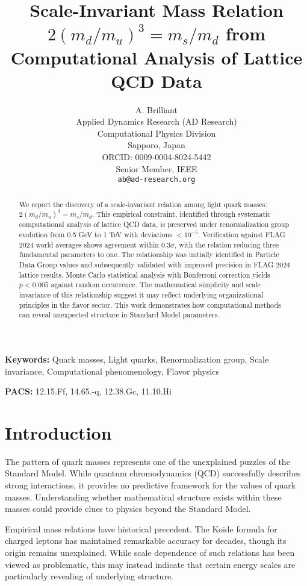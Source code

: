 \documentclass[12pt]{article}
\title{Scale-Invariant Mass Relation $2(m_d/m_u)^3 = m_s/m_d$ from Computational Analysis of Lattice QCD Data}
\author{A. Brilliant \\
\small Applied Dynamics Research (AD Research) \\
\small Computational Physics Division \\
\small Sapporo, Japan \\
\small ORCID: 0009-0004-8024-5442 \\
\small Senior Member, IEEE \\
\small \texttt{ab@ad-research.org}}
\date{}
\begin{document}
\pagestyle{plain}

\maketitle


\begin{abstract}
We report the discovery of a scale-invariant relation among light quark masses: $2(m_d/m_u)^3 = m_s/m_d$. This empirical constraint, identified through systematic computational analysis of lattice QCD data, is preserved under renormalization group evolution from 0.5 GeV to 1 TeV with deviations $<10^{-5}$. Verification against FLAG 2024 world averages shows agreement within $0.3\sigma$, with the relation reducing three fundamental parameters to one. The relationship was initially identified in Particle Data Group values and subsequently validated with improved precision in FLAG 2024 lattice results. Monte Carlo statistical analysis with Bonferroni correction yields $p < 0.005$ against random occurrence. The mathematical simplicity and scale invariance of this relationship suggest it may reflect underlying organizational principles in the flavor sector. This work demonstrates how computational methods can reveal unexpected structure in Standard Model parameters.
\end{abstract}

\textbf{Keywords:} Quark masses, Light quarks, Renormalization group, Scale invariance, Computational phenomenology, Flavor physics

\textbf{PACS:} 12.15.Ff, 14.65.-q, 12.38.Gc, 11.10.Hi

\section{Introduction}
\label{sec:intro}

The pattern of quark masses represents one of the unexplained puzzles of the Standard Model. While quantum chromodynamics (QCD) successfully describes strong interactions, it provides no predictive framework for the values of quark masses. Understanding whether mathematical structure exists within these masses could provide clues to physics beyond the Standard Model.

Empirical mass relations have historical precedent. The Koide formula for charged leptons has maintained remarkable accuracy for decades, though its origin remains unexplained. While scale dependence of such relations has been viewed as problematic, this may instead indicate that certain energy scales are particularly revealing of underlying structure.
\end{document}
